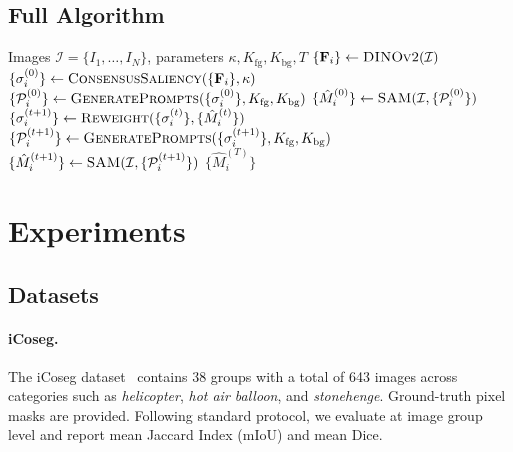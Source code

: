 \documentclass[10pt,twocolumn,letterpaper]{article}
\begin{document}
\subsection{Full Algorithm}

\begin{algorithm}[t]
\caption{SAMCo}\label{alg:samco}
\begin{algorithmic}[1]
  \Require Images $\mathcal{I}=\{I_1,\ldots,I_N\}$, parameters $\kappa, K_\text{fg}, K_\text{bg}, T$
  \State $\{\mathbf{F}_i\} \gets \textsc{DINOv2}(\mathcal{I})$
  \State $\{\sigma_i^{(0)}\} \gets \textsc{ConsensusSaliency}(\{\mathbf{F}_i\}, \kappa)$
  \State $\{\mathcal{P}_i^{(0)}\} \gets \textsc{GeneratePrompts}(\{\sigma_i^{(0)}\}, K_\text{fg}, K_\text{bg})$
  \State $\{\hat{M}_i^{(0)}\} \gets \textsc{SAM}(\mathcal{I}, \{\mathcal{P}_i^{(0)}\})$
    \State $\{\sigma_i^{(t+1)}\} \gets \textsc{Reweight}(\{\sigma_i^{(t)}\}, \{\hat{M}_i^{(t)}\})$
    \State $\{\mathcal{P}_i^{(t+1)}\} \gets \textsc{GeneratePrompts}(\{\sigma_i^{(t+1)}\}, K_\text{fg}, K_\text{bg})$
    \State $\{\hat{M}_i^{(t+1)}\} \gets \textsc{SAM}(\mathcal{I}, \{\mathcal{P}_i^{(t+1)}\})$
  \EndFor
  \State \Return $\{\hat{M}_i^{(T)}\}$
\end{algorithmic}
\end{algorithm}

\section{Experiments}
\label{sec:experiments}

\subsection{Datasets}

\paragraph{iCoseg.}
The iCoseg dataset~\cite{batra2010icoseg} contains 38 groups with a total of
643 images across categories such as \textit{helicopter}, \textit{hot air
balloon}, and \textit{stonehenge}.
Ground-truth pixel masks are provided.
Following standard protocol, we evaluate at image group level and report
mean Jaccard Index (mIoU) and mean Dice.
\end{document}

